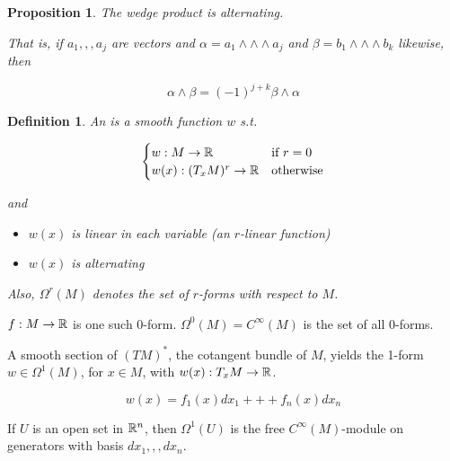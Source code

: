 \documentclass[11pt]{amsbook}
\theoremstyle{mystyle} \newtheorem{thrm}[thm]{Theorem}
\theoremstyle{mystyle} \newtheorem{defi}[thm]{Definition}
\theoremstyle{mystyle} \newtheorem{coro}[thm]{Corollary}
\theoremstyle{mystyle} \newtheorem{propo}[thm]{Proposition}
\theoremstyle{mystyle} \newtheorem{lemm}[thm]{Lemma}
\numberwithin{thm}{section}
\begin{document}
\begin{propo}
	The wedge product is alternating.

	That is, if $a_1,,,a_j$ are vectors and $\alpha = a_1 \wedge\wedge\wedge a_j$ and $\beta = b_1 \wedge\wedge\wedge b_k$ likewise, then

	$$\alpha \wedge \beta = (-1)^{j+k} \beta \wedge \alpha$$
\end{propo}

\begin{defi}
	An  is a smooth function $w$ s.t.

	$$\begin{cases}
		w: M \to {\mathbb R} 	&\text{if $r = 0$} \\
		w(x): (T_xM)^r \to {\mathbb R} 	&\text{otherwise} \\
	\end{cases}$$

	and

	\begin{itemize}
	  \item $w(x)$ is linear in each variable (an $r$-linear function)
	  \item $w(x)$ is alternating
	\end{itemize}

	Also, $\Omega^r(M)$ denotes the set of $r$-forms with respect to $M$.
\end{defi}

\begin{example}[0-form]
	$f: M \to {\mathbb R}$ is one such 0-form.
	$\Omega^0(M) = C^\infty(M)$ is the set of all 0-forms.
\end{example}

\begin{example}[1-form]
	A smooth section of $(TM)^*$, the cotangent bundle of $M$, yields the 1-form
	$w \in \Omega^1(M)$, for $x \in M$, with $w(x): T_xM \to {\mathbb R}$.
\end{example}

\begin{example}[1-form]
	$$w(x) = f_1(x)dx_1 +++ f_n(x)dx_n$$
\end{example}

\begin{example}
	If $U$ is an open set in ${\mathbb R}^n$, then $\Omega^1(U)$ is the free $C^\infty(M)$-module on generators with basis ${dx_1,,,dx_n}$.
\end{example}
\end{document}
